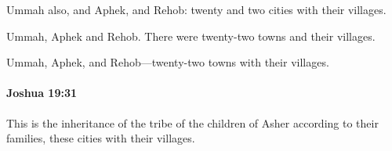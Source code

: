 			\begin{versebox}
					\item[BHS] 
					\item[ASV] Ummah also, and Aphek, and Rehob: twenty and two cities with their villages.
					\item[NIV] Ummah, Aphek and Rehob. There were twenty-two towns and their villages.
					\item[NRSV] Ummah, Aphek, and Rehob—twenty-two towns with their villages.
			\end{versebox}

		\paragraph{Joshua 19:31} %
			\label{JOSHUA-19-31}

			This is the inheritance of the tribe of the children of Asher according to their families, these cities with their villages.

